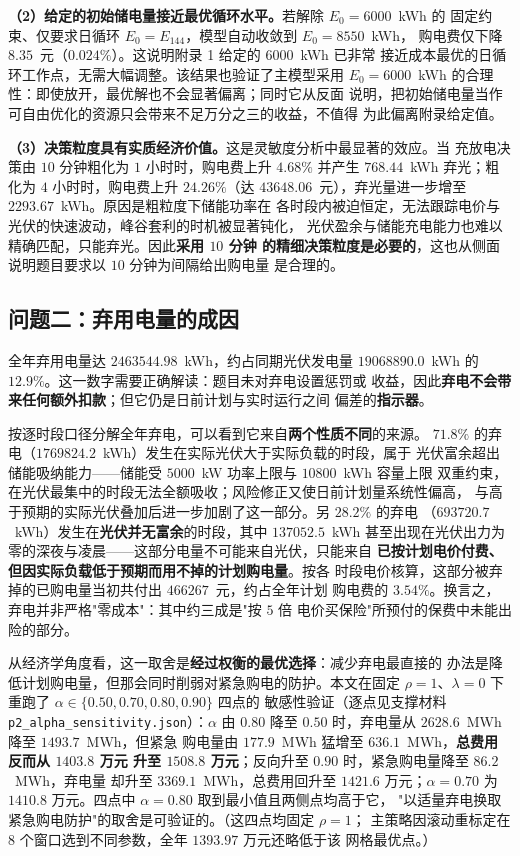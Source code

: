 \textbf{（2）给定的初始储电量接近最优循环水平。}若解除 $E_0 = 6000$~kWh 的
固定约束、仅要求日循环 $E_0 = E_{144}$，模型自动收敛到 $E_0 = 8550$~kWh，
购电费仅下降 $8.35$~元（$0.024\%$）。这说明附录 1 给定的 $6000$~kWh 已非常
接近成本最优的日循环工作点，无需大幅调整。该结果也验证了主模型采用
$E_0 = 6000$~kWh 的合理性：即使放开，最优解也不会显著偏离；同时它从反面
说明，把初始储电量当作可自由优化的资源只会带来不足万分之三的收益，不值得
为此偏离附录给定值。

\textbf{（3）决策粒度具有实质经济价值。}这是灵敏度分析中最显著的效应。当
充放电决策由 $10$ 分钟粗化为 $1$ 小时时，购电费上升 $4.68\%$ 并产生
$768.44$~kWh 弃光；粗化为 $4$ 小时时，购电费上升 $24.26\%$（达
$43648.06$~元），弃光量进一步增至 $2293.67$~kWh。原因是粗粒度下储能功率在
各时段内被迫恒定，无法跟踪电价与光伏的快速波动，峰谷套利的时机被显著钝化，
光伏盈余与储能充电能力也难以精确匹配，只能弃光。因此\textbf{采用 $10$ 分钟
的精细决策粒度是必要的}，这也从侧面说明题目要求以 $10$ 分钟为间隔给出购电量
是合理的。

\subsection{问题二：弃用电量的成因}

全年弃用电量达 $2463544.98$~kWh，约占同期光伏发电量
$19068890.0$~kWh 的 $12.9\%$。这一数字需要正确解读：题目未对弃电设置惩罚或
收益，因此\textbf{弃电不会带来任何额外扣款}；但它仍是日前计划与实时运行之间
偏差的\textbf{指示器}。

按逐时段口径分解全年弃电，可以看到它来自\textbf{两个性质不同}的来源。
$71.8\%$ 的弃电（$1769824.2$~kWh）发生在实际光伏大于实际负载的时段，属于
光伏富余超出储能吸纳能力——储能受 $5000$~kW 功率上限与 $10800$~kWh 容量上限
双重约束，在光伏最集中的时段无法全额吸收；风险修正又使日前计划量系统性偏高，
与高于预期的实际光伏叠加后进一步加剧了这一部分。另 $28.2\%$ 的弃电
（$693720.7$~kWh）发生在\textbf{光伏并无富余}的时段，其中 $137052.5$~kWh
甚至出现在光伏出力为零的深夜与凌晨——这部分电量不可能来自光伏，只能来自
\textbf{已按计划电价付费、但因实际负载低于预期而用不掉的计划购电量}。按各
时段电价核算，这部分被弃掉的已购电量当初共付出 $466267$~元，约占全年计划
购电费的 $3.54\%$。换言之，弃电并非严格"零成本"：其中约三成是"按 $5$ 倍
电价买保险"所预付的保费中未能出险的部分。

从经济学角度看，这一取舍是\textbf{经过权衡的最优选择}：减少弃电最直接的
办法是降低计划购电量，但那会同时削弱对紧急购电的防护。本文在固定
$\rho=1$、$\lambda=0$ 下重跑了 $\alpha\in\{0.50,0.70,0.80,0.90\}$ 四点的
敏感性验证（逐点见支撑材料 \texttt{p2\_alpha\_sensitivity.json}）：$\alpha$
由 $0.80$ 降至 $0.50$ 时，弃电量从 $2628.6$~MWh 降至 $1493.7$~MWh，但紧急
购电量由 $177.9$~MWh 猛增至 $636.1$~MWh，\textbf{总费用反而从 $1403.8$ 万元
升至 $1508.8$ 万元}；反向升至 $0.90$ 时，紧急购电量降至 $86.2$~MWh，弃电量
却升至 $3369.1$~MWh，总费用回升至 $1421.6$ 万元；$\alpha=0.70$ 为
$1410.8$ 万元。四点中 $\alpha=0.80$ 取到最小值且两侧点均高于它，
"以适量弃电换取紧急购电防护"的取舍是可验证的。（这四点均固定 $\rho=1$；
主策略因滚动重标定在 $8$ 个窗口选到不同参数，全年 $1393.97$ 万元还略低于该
网格最优点。）

